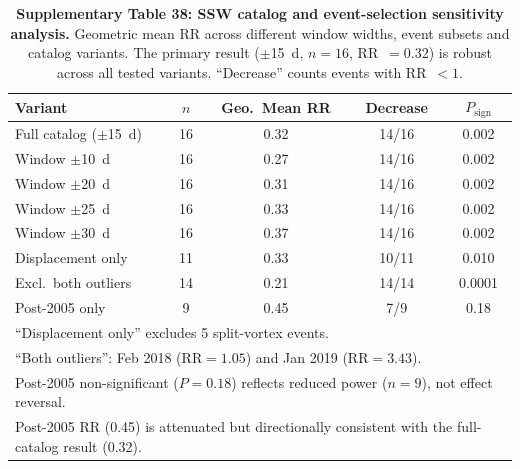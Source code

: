 \documentclass[11pt,letterpaper]{article}
\begin{document}
\begin{table}[htbp]
\centering
\caption{\textbf{Supplementary Table 38: SSW catalog and event-selection sensitivity analysis.} Geometric mean RR across different window widths, event subsets and catalog variants. The primary result ($\pm$15~d, $n=16$, RR~$=0.32$) is robust across all tested variants. ``Decrease'' counts events with RR~$<1$.}
\label{tab:ssw_catalog}
\begin{tabular}{lcccc}
\hline
Variant & $n$ & Geo.\ Mean RR & Decrease & $P_{\mathrm{sign}}$ \\
\hline
Full catalog ($\pm$15~d) & 16 & 0.32 & 14/16 & 0.002 \\
Window $\pm$10~d & 16 & 0.27 & 14/16 & 0.002 \\
Window $\pm$20~d & 16 & 0.31 & 14/16 & 0.002 \\
Window $\pm$25~d & 16 & 0.33 & 14/16 & 0.002 \\
Window $\pm$30~d & 16 & 0.37 & 14/16 & 0.002 \\
Displacement only & 11 & 0.33 & 10/11 & 0.010 \\
Excl.\ both outliers & 14 & 0.21 & 14/14 & 0.0001 \\
Post-2005 only & 9 & 0.45 & 7/9 & 0.18 \\
\hline
\multicolumn{5}{l}{\footnotesize ``Displacement only'' excludes 5 split-vortex events.} \\
\multicolumn{5}{l}{\footnotesize ``Both outliers'': Feb 2018 ($\mathrm{RR}=1.05$) and Jan 2019 ($\mathrm{RR}=3.43$).} \\
\multicolumn{5}{l}{\footnotesize Post-2005 non-significant ($P=0.18$) reflects reduced power ($n=9$), not effect reversal.} \\
\multicolumn{5}{l}{\footnotesize Post-2005 RR (0.45) is attenuated but directionally consistent with the full-catalog result (0.32).} \\
\end{tabular}
\end{table}
\end{document}
